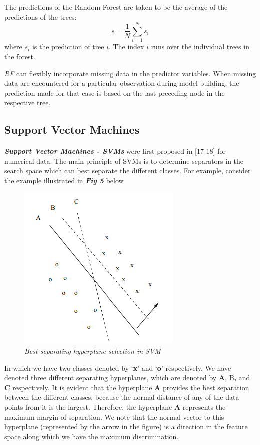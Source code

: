 \documentclass[conference]{IEEEtran}
\begin{document}
The predictions of the Random Forest are taken to be the average of the predictions of the trees:
\[s=\frac{1}{N}\sum_{i=1}^{N}s_i\]
where $s_i$ is the prediction of tree $i$. The index $i$ runs over the individual trees in the forest.

\textit{RF} can flexibly incorporate missing data in the predictor variables. When missing data are encountered for a particular observation during model building, the prediction made for that case is based on the last preceding node in the respective tree. 
\subsection{Support Vector Machines}
\textbf{\textit{Support Vector Machines - SVMs}} were first proposed in [17 18] for numerical data. The main principle of SVMs is to determine separators in the search space which can best separate the different classes. For example,
consider the example illustrated in \textit{\textbf{Fig 5}} below
\begin{figure}[h]
\includegraphics[scale=0.45]{svm.png}
\centering
\caption{\textit{Best separating hyperplane selection in SVM}}
\end{figure}

In which we have two classes denoted by \enquote*{\textbf{x}} and \enquote*{\textbf{o}} respectively. We have denoted three different separating hyperplanes, which are denoted by \textbf{A}, B\textbf{,} and \textbf{C} respectively.
It is evident that the hyperplane \textbf{A} provides the best separation
between the different classes, because the normal distance of any of the
data points from it is the largest. Therefore, the hyperplane \textbf{A} represents
the maximum margin of separation. We note that the normal vector to
this hyperplane (represented by the arrow in the figure) is a direction in
the feature space along which we have the maximum discrimination. 
\end{document}
